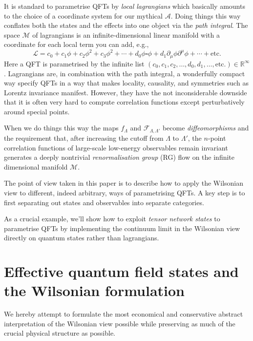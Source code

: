 \documentclass[11pt]{amsart}
\theoremstyle{plain}%
\theoremstyle{definition}
\theoremstyle{remark}
\begin{document}
It is standard to parametrise QFTs by \emph{local lagrangians} which basically amounts to the choice of a coordinate system for our mythical $\mathcal{A}$. Doing things this way conflates both the states and the effects into one object via the \emph{path integral}. The space $\mathcal{M}$ of lagrangians is an infinite-dimensional linear manifold with a coordinate for each local term you can add, e.g., 
\begin{equation}
	\mathcal{L} = c_0 + c_1\phi + c_2\phi^2 + c_3\phi^2 + \cdots + d_0 \phi \square \phi + d_1 \partial_\mu \phi \partial^\mu \phi +\cdots+ \text{etc.}
\end{equation}
Here a QFT is parametrised by the infinite list $(c_0, c_1, c_2, \ldots, d_0, d_1, \ldots, \text{etc.}) \in \mathbb{R}^\infty$. Lagrangians are, in combination with the path integral, a wonderfully compact way specify QFTs in a way that makes locality, causality, and symmetries such as Lorentz invariance manifest. However, they have the not inconsiderable downside that it is often very hard to compute correlation functions except perturbatively around special points.  

When we do things this way the maps $f_\Lambda$ and $\mathcal{F}_{\Lambda,\Lambda'}$ become \emph{diffeomorphisms} and the requirement that, after increasing the cutoff from $\Lambda$ to $\Lambda'$, the $n$-point correlation functions of large-scale low-energy observables remain invariant generates a deeply nontrivial \emph{renormalisation group} (RG) flow on the infinite dimensional manifold $\mathcal{M}$.  

The point of view taken in this paper is to describe how to apply the Wilsonian view to different, indeed arbitrary, ways of parametrising QFTs. A key step is to first separating out states and observables into separate categories.

As a crucial example, we'll show how to exploit \emph{tensor network states} to parametrise QFTs by implementing the continuum limit in the Wilsonian view directly on quantum states rather than lagrangians.


\section{Effective quantum field states and the Wilsonian formulation}\label{sec:effectiveqftstates}

We hereby attempt to formulate the most economical and conservative abstract interpretation of the Wilsonian view possible while preserving as much of the crucial physical structure as possible.
\end{document}
